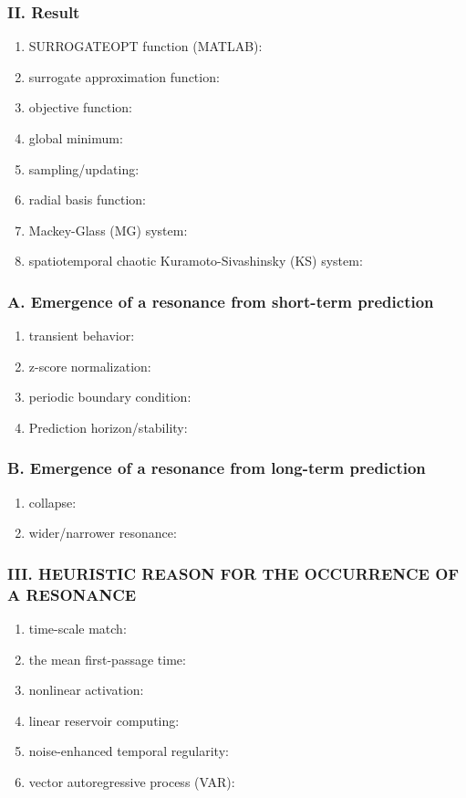 \subsubsection{II. Result}
\begin{enumerate}
  \item SURROGATEOPT function (MATLAB):
  \item surrogate approximation function:
  \item objective function:
  \item global minimum:
  \item sampling/updating:
  \item radial basis function: 
  \item Mackey-Glass (MG) system:
  \item spatiotemporal chaotic Kuramoto-Sivashinsky (KS) system: 
\end{enumerate}

\subsubsection{A. Emergence of a resonance from short-term prediction}
\begin{enumerate}
  \item transient behavior:
  \item z-score normalization: 
  \item periodic boundary condition:
  \item Prediction horizon/stability: 
\end{enumerate}

\subsubsection{B. Emergence of a resonance from long-term prediction}
\begin{enumerate}
  \item collapse:
  \item wider/narrower resonance:
\end{enumerate}

\subsubsection{III. HEURISTIC REASON FOR THE OCCURRENCE
OF A RESONANCE}
\begin{enumerate}
  \item time-scale match:
  \item the mean first-passage time:
  \item nonlinear activation: 
  \item linear reservoir computing:
  \item noise-enhanced temporal regularity:
  \item vector autoregressive process (VAR): 
\end{enumerate}

